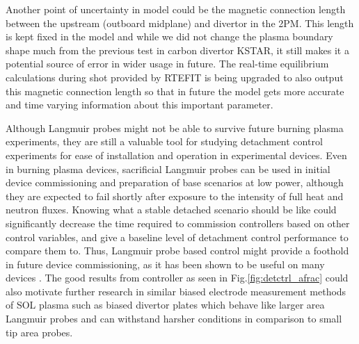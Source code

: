 Another point of uncertainty in \Afrac model could be the magnetic connection length between the upstream (outboard midplane) and divertor in the 2PM\cite{Leonard_2018_PPCF}.
This length is kept fixed in the model and while we did not change the plasma boundary shape much from the previous test\cite{Eldon_2022_PPCF} in carbon divertor KSTAR, it still makes it a potential source of error in wider usage in future.
The real-time equilibrium calculations during shot provided by RTEFIT is being upgraded to also output this magnetic connection length so that in future the model gets more accurate and time varying information about this important parameter.

Although Langmuir probes might not be able to survive future burning plasma experiments, they are still a valuable tool for studying detachment control experiments for ease of installation and operation in experimental devices.
Even in burning plasma devices, sacrificial Langmuir probes can be used in initial device commissioning and preparation of base scenarios at low power, although they are expected to fail shortly after exposure to the intensity of full heat and neutron fluxes.
Knowing what a stable detached scenario should be like could significantly decrease the time required to commission controllers based on other control variables, and give a baseline level of detachment control performance to compare them to.
Thus, Langmuir probe based control might provide a foothold in future device commissioning, as it has been shown to be useful on many devices \cite{Eldon_2021_NME, Guillemaut_2017_PPCF, Yuan_2020_FED, Khodunov_2021_PPCF}.
The good results from \Afrac controller as seen in Fig.\ref{fig:detctrl_afrac} could also motivate further research in similar biased electrode measurement methods of SOL plasma such as biased divertor plates \cite{Toi_2023_NF, Cui_2024_NF} which behave like larger area Langmuir probes and can withstand harsher conditions in comparison to small tip area probes.

